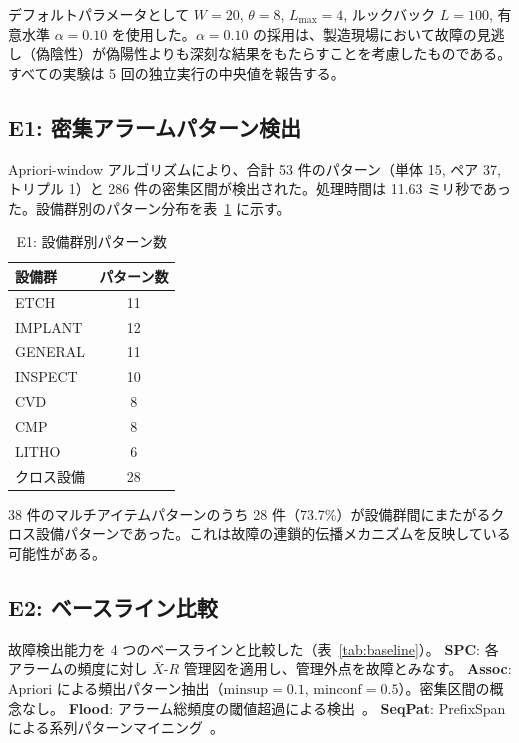 \documentclass[11pt]{article}
\begin{document}
デフォルトパラメータとして $W = 20$, $\theta = 8$, $L_{\max} = 4$, ルックバック $L = 100$, 有意水準 $\alpha = 0.10$ を使用した。$\alpha = 0.10$ の採用は、製造現場において故障の見逃し（偽陰性）が偽陽性よりも深刻な結果をもたらすことを考慮したものである。すべての実験は 5 回の独立実行の中央値を報告する。

\subsection{E1: 密集アラームパターン検出}

Apriori-window アルゴリズムにより、合計 53 件のパターン（単体 15, ペア 37, トリプル 1）と 286 件の密集区間が検出された。処理時間は 11.63 ミリ秒であった。設備群別のパターン分布を表~\ref{tab:e1_groups} に示す。

\begin{table}[t]
\centering
\caption{E1: 設備群別パターン数}
\label{tab:e1_groups}
\begin{tabular}{lc}
\toprule
設備群 & パターン数 \\
\midrule
ETCH & 11 \\
IMPLANT & 12 \\
GENERAL & 11 \\
INSPECT & 10 \\
CVD & 8 \\
CMP & 8 \\
LITHO & 6 \\
\midrule
クロス設備 & 28 \\
\bottomrule
\end{tabular}
\end{table}

38 件のマルチアイテムパターンのうち 28 件（73.7\%）が設備群間にまたがるクロス設備パターンであった。これは故障の連鎖的伝播メカニズムを反映している可能性がある。

\subsection{E2: ベースライン比較}

故障検出能力を 4 つのベースラインと比較した（表~\ref{tab:baseline}）。
\textbf{SPC}: 各アラームの頻度に対し $\bar{X}$-$R$ 管理図を適用し、管理外点を故障とみなす。
\textbf{Assoc}: Apriori による頻出パターン抽出（$\mathrm{minsup}=0.1$, $\mathrm{minconf}=0.5$）。密集区間の概念なし。
\textbf{Flood}: アラーム総頻度の閾値超過による検出~\citep{wang2016alarm}。
\textbf{SeqPat}: PrefixSpan による系列パターンマイニング~\citep{hu2018alarm}。
\end{document}
